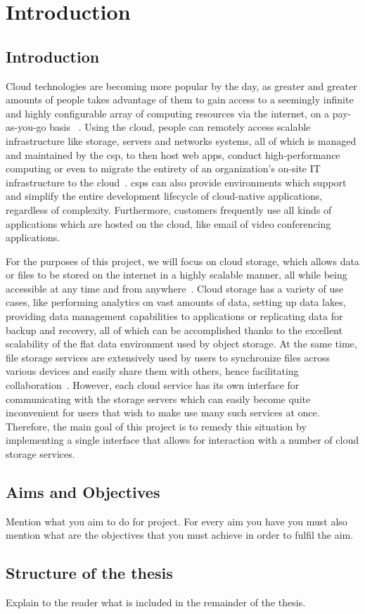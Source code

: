\tableofcontents

\chapter{Introduction}

\section{Introduction}
Cloud technologies are becoming more popular by the day, as greater and greater amounts of people takes advantage of them to gain access to a seemingly infinite and highly configurable array of computing resources via the internet, on a pay-as-you-go basis ~\cite{gvr}. Using the cloud, people can remotely access scalable infrastructure like storage, servers and networks systems, all of which is managed and maintained by the \ac{csp}, to then host web apps, conduct high-performance computing or even to migrate the entirety of an organization's on-site IT infrastructure to the cloud~\cite{iaas}. \ac{csp}s can also provide environments which support and simplify the entire development lifecycle of cloud-native applications, regardless of complexity. Furthermore, customers frequently use all kinds of applications which are hosted on the cloud, like email of video conferencing applications.

For the purposes of this project, we will focus on cloud storage, which allows data or files to be stored on the internet in a highly scalable manner, all while being accessible at any time and from anywhere~\cite{s3_cloud_storage}. Cloud storage has a variety of use cases, like performing analytics on vast amounts of data, setting up data lakes, providing data management capabilities to applications or replicating data for backup and recovery, all of which can be accomplished thanks to the excellent scalability of the flat data environment used by object storage. At the same time, file storage services are extensively used by users to synchronize files across various devices and easily share them with others, hence facilitating collaboration~\cite{objectvsfile,objectvsfile2}. However, each cloud service has its own interface for communicating with the storage servers which can easily become quite inconvenient for users that wish to make use many such services at once. Therefore, the main goal of this project is to remedy this situation by implementing a single interface that allows for interaction with a number of cloud storage services.

\section{Aims and Objectives}
Mention what you aim to do for project. For every aim you have you must also mention what are the objectives that you must achieve in order to fulfil the aim.

\section{Structure of the thesis}
Explain to the reader what is included in the remainder of the thesis.
